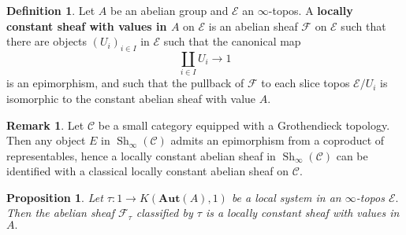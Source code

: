 \documentclass[12pt]{amsart}
\newtheorem{proposition}[dummy]{Proposition}
\theoremstyle{definition}
\newtheorem{definition}[dummy]{Definition}
\newtheorem{remark}[dummy]{Remark}
\newcommand{\cE}{\mathcal{E}}
\newcommand{\cF}{\mathcal{F}}
\newcommand{\sC}{\mathscr{C}}
\newcommand{\Sh}{\operatorname{Sh}}
\renewcommand{\i}{\infty}
\def\Shi{\Sh_\i}
\def\Aut{\mathbf{Aut}}
\begin{document}
\begin{definition}
Let $A$ be an abelian group and $\cE$ an $\i$-topos. A \textbf{locally constant sheaf with values in $A$} on $\cE$ is an abelian sheaf $\cF$ on $\cE$ such that there are objects $\left(U_i\right)_{i \in I}$ in $\cE$ such that the canonical map $$\underset{i \in I} \coprod U_i \to 1$$ is an epimorphism, and such that the pullback of $\cF$ to each slice topos $\cE/U_i$ is isomorphic to the constant abelian sheaf with value $A.$
\end{definition}

\begin{remark}\label{rmk:ordinary locally constant}
Let $\sC$ be a small category equipped with a Grothendieck topology. Then any object $E$ in $\Shi\left(\sC\right)$ admits an epimorphism from a coproduct of representables, hence a locally constant abelian sheaf in $\Shi\left(\sC\right)$ can be identified with a classical locally constant abelian sheaf on $\sC.$
\end{remark}

\begin{proposition}
Let $\tau:1 \to K\left(\Aut\left(A\right),1\right)$ be a local system in an $\i$-topos $\cE.$ Then the abelian sheaf $\cF_\tau$ classified by $\tau$ is a locally constant sheaf with values in $A.$
\end{proposition}
\end{document}
